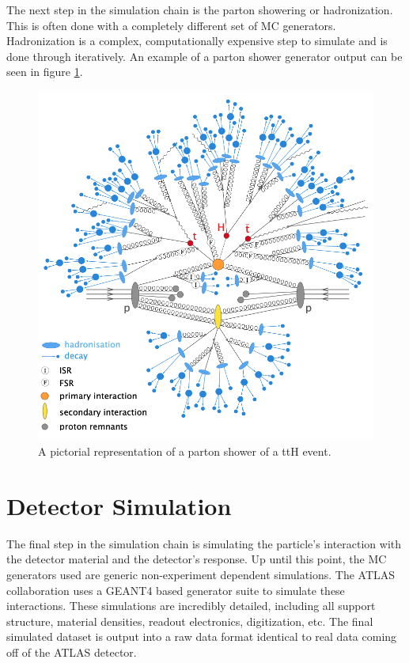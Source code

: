 	The next step in the simulation chain is the parton showering or hadronization. This is often done with a completely different set of MC generators. Hadronization is a complex, computationally expensive step to simulate and is done through iteratively. An example of a parton shower generator output can be seen in figure \ref{fig:hadronization}.

	\begin{figure}[!ht]
	\centering
	\includegraphics[width=\textwidth,keepaspectratio=true]{chapters/chapter4_simulation/images/tth_hadronization_gen.png}
	\caption{\label{fig:hadronization} A pictorial representation of a parton shower of a ttH event. \cite{Wanotayaroj:2242196}}
	\end{figure}	

	\section{Detector Simulation}\label{sec:detector-sim}
	The final step in the simulation chain is simulating the particle's interaction with the detector material and the detector's response. Up until this point, the MC generators used are generic non-experiment dependent simulations. The ATLAS collaboration uses a GEANT4 based generator suite to simulate these interactions. \cite{GEANT4} These simulations are incredibly detailed, including all support structure, material densities, readout electronics, digitization, etc. The final simulated dataset is output into a raw data format identical to real data coming off of the ATLAS detector.